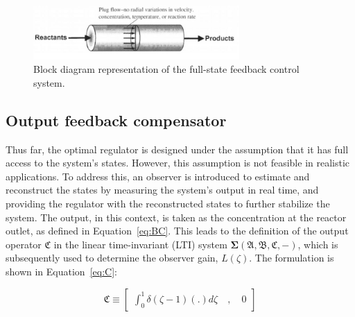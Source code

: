 \begin{figure}[H]
    \centering
    \includegraphics*[width=0.7\textwidth]{Figures/sample.jpeg}
    \caption{Block diagram representation of the full-state feedback control system.}
    \label{fig:block_diagram}
\end{figure}

\subsection{Output feedback compensator}

Thus far, the optimal regulator is designed under the assumption that it has full access to the system's states. However, this assumption is not feasible in realistic applications. To address this, an observer is introduced to estimate and reconstruct the states by measuring the system's output in real time, and providing the regulator with the reconstructed states to further stabilize the system. The output, in this context, is taken as the concentration at the reactor outlet, as defined in Equation~\ref{eq:BC}. This leads to the definition of the output operator $\mathfrak{C}$ in the linear time-invariant (LTI) system $\mathbf{\Sigma(\mathfrak{A},\mathfrak{B},\mathfrak{C},-)}$, which is subsequently used to determine the observer gain, $L(\zeta)$. The formulation is shown in Equation~\ref{eq:C}:

\begin{equation} \label{eq:C}
    \mathfrak{C} \equiv \begin{bmatrix}
        \int_0^1 \delta(\zeta-1) (.) d\zeta \quad , \quad 0
    \end{bmatrix}
\end{equation}

